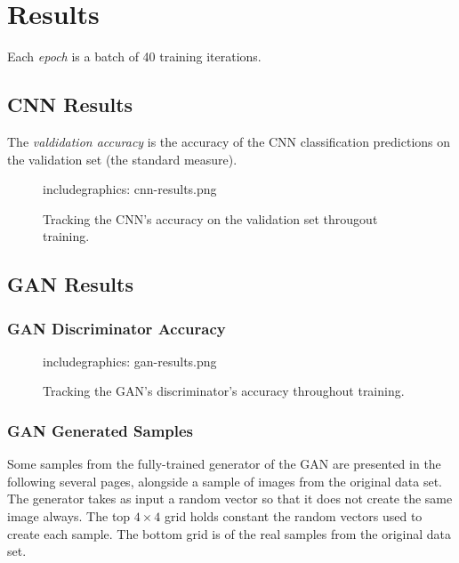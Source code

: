 \documentclass{article}
\renewcommand{\it}{\textit}
\newcommand{\tmpincludegraphics}[1][opt]{includegraphics: }
\begin{document}
\newpage
\restoregeometry
\pagestyle{plain}
\section{Results}

Each \it{epoch} is a batch of 40 training iterations.

\subsection{CNN Results}

The \it{valdidation accuracy} is the accuracy of the CNN classification predictions on the validation set (the standard measure).

\begin{figure}[ht]
\label{fig:cnn-results}
\centering
\tmpincludegraphics[width=\textwidth]{cnn-results.png}
\caption{Tracking the CNN's accuracy on the validation set througout training.}
\end{figure}

\newpage

\subsection{GAN Results}

\subsubsection{GAN Discriminator Accuracy}

\begin{figure}[ht]
\label{fig:gan-results}
\centering
\tmpincludegraphics[width=\textwidth]{gan-results.png}
\caption{Tracking the GAN's discriminator's accuracy throughout training.}
\end{figure}

\subsubsection{GAN Generated Samples}

Some samples from the fully-trained generator of the GAN are presented in the following several pages, alongside a sample of images from the original data set.
The generator takes as input a random vector so that it does not create the same image always.
The top $4 \times 4$ grid holds constant the random vectors used to create each sample.
The bottom grid is of the real samples from the original data set.
\end{document}

